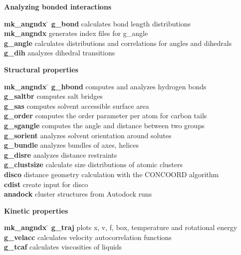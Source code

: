 \begin{description}
\item {\large\bf Analyzing bonded interactions}
\vspace{-2ex}\begin{tabbing}
{\bf mk\_angndx} \= \kill
{\bf g\_bond} \> calculates bond length distributions \\
{\bf mk\_angndx} \> generates index files for g\_angle \\
{\bf g\_angle} \> calculates distributions and correlations for angles and dihedrals \\
{\bf g\_dih} \> analyzes dihedral transitions \\
\end{tabbing}\vspace{-2ex}

\item {\large\bf Structural properties}
\vspace{-2ex}\begin{tabbing}
{\bf mk\_angndx} \= \kill
{\bf g\_hbond} \> computes and analyzes hydrogen bonds \\
{\bf g\_saltbr} \> computes salt bridges \\
{\bf g\_sas} \> computes solvent accessible surface area \\
{\bf g\_order} \> computes the order parameter per atom for carbon tails \\
{\bf g\_sgangle} \> computes the angle and distance between two groups \\
{\bf g\_sorient} \> analyzes solvent orientation around solutes \\
{\bf g\_bundle} \> analyzes bundles of axes, {\eg} helices \\
{\bf g\_disre} \> analyzes distance restraints \\
{\bf g\_clustsize} \> calculate size distributions of atomic clusters \\
{\bf disco} \> distance geometry calculation with the CONCOORD algorithm \\
{\bf cdist} \> create input for disco \\
{\bf anadock} \> cluster structures from Autodock runs \\
\end{tabbing}\vspace{-2ex}

\item {\large\bf Kinetic properties}
\vspace{-2ex}\begin{tabbing}
{\bf mk\_angndx} \= \kill
{\bf g\_traj} \> plots x, v, f, box, temperature and rotational energy \\
{\bf g\_velacc} \> calculates velocity autocorrelation functions \\
{\bf g\_tcaf} \> calculates viscosities of liquids \\
\end{tabbing}\vspace{-2ex}


\end{description}
